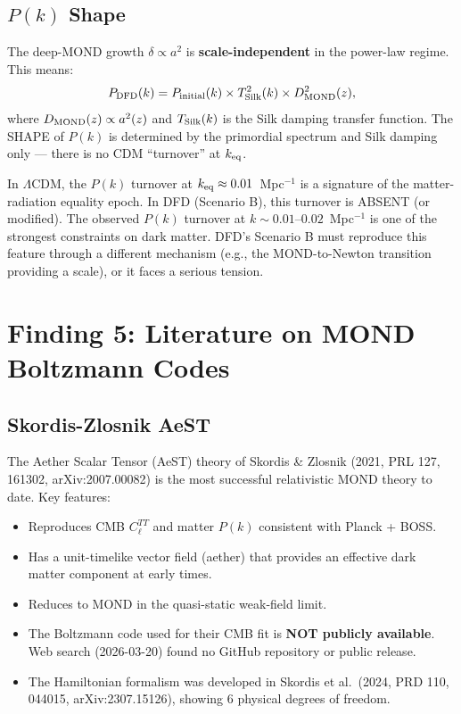 \documentclass[11pt]{article}
\theoremstyle{definition}
\theoremstyle{remark}
\newcommand{\LCDM}{$\Lambda$CDM}
\begin{document}
\subsection{$P(k)$ Shape}

The deep-MOND growth $\delta \propto a^2$ is \textbf{scale-independent}
in the power-law regime. This means:
\begin{equation}
P_{\rm DFD}(k) = P_{\rm initial}(k) \times T_{\rm Silk}^2(k)
\times D_{\rm MOND}^2(z),
\end{equation}
where $D_{\rm MOND}(z) \propto a^2(z)$ and $T_{\rm Silk}(k)$ is the
Silk damping transfer function. The SHAPE of $P(k)$ is determined
by the primordial spectrum and Silk damping only --- there is no CDM
``turnover'' at $k_{\rm eq}$.

In \LCDM, the $P(k)$ turnover at $k_{\rm eq} \approx 0.01$~Mpc$^{-1}$
is a signature of the matter-radiation equality epoch. In DFD (Scenario B),
this turnover is ABSENT (or modified). The observed $P(k)$ turnover at
$k \sim 0.01$--$0.02$~Mpc$^{-1}$ is one of the strongest constraints
on dark matter. DFD's Scenario B must reproduce this feature through
a different mechanism (e.g., the MOND-to-Newton transition providing
a scale), or it faces a serious tension.


\section{Finding 5: Literature on MOND Boltzmann Codes}
\label{sec:literature}

\subsection{Skordis-Zlosnik AeST}

The Aether Scalar Tensor (AeST) theory of Skordis \& Zlosnik (2021,
PRL 127, 161302, arXiv:2007.00082) is the most successful relativistic
MOND theory to date. Key features:
\begin{itemize}
\item Reproduces CMB $C_\ell^{TT}$ and matter $P(k)$ consistent with
  Planck + BOSS.
\item Has a unit-timelike vector field (aether) that provides an
  effective dark matter component at early times.
\item Reduces to MOND in the quasi-static weak-field limit.
\item The Boltzmann code used for their CMB fit is \textbf{NOT publicly
  available}. Web search (2026-03-20) found no GitHub repository or
  public release.
\item The Hamiltonian formalism was developed in Skordis et al.\ (2024,
  PRD 110, 044015, arXiv:2307.15126), showing 6 physical degrees of
  freedom.
\end{itemize}
\end{document}
